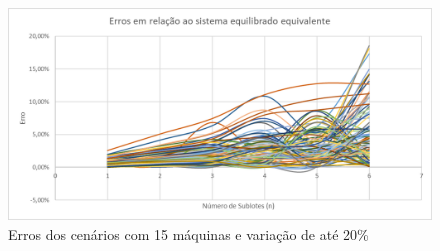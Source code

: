 \begin{figure}[!ht]
    \centering
    \includegraphics[width=12cm]{Resultados/Figuras/e15_20}
    \caption{Erros dos cenários com 15 máquinas e variação de até 20\%}
    \label{fig:e15_20}
\end{figure}